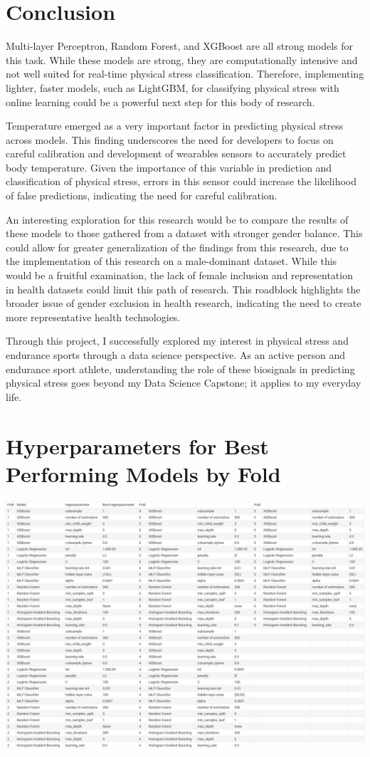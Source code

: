 \documentclass{article}
\begin{document}
\section{Conclusion}

Multi-layer Perceptron, Random Forest, and XGBoost are all strong models for this task. While these models are strong, they are computationally intensive and not well suited for real-time physical stress classification. Therefore, implementing lighter, faster models, such as LightGBM, for classifying physical stress with online learning could be a powerful next step for this body of research. 

Temperature emerged as a very important factor in predicting physical stress across models. This finding underscores the need for developers to focus on careful calibration and development of wearables sensors to accurately predict body temperature. Given the importance of this variable in prediction and classification of physical stress, errors in this sensor could increase the likelihood of false predictions, indicating the need for careful calibration.

An interesting exploration for this research would be to compare the results of these models to those gathered from a dataset with stronger gender balance. This could allow for greater generalization of the findings from this research, due to the implementation of this research on a male-dominant dataset. While this would be a fruitful examination, the lack of female inclusion and representation in health datasets could limit this path of research. This roadblock highlights the broader issue of gender exclusion in health research, indicating the need to create more representative health technologies.

Through this project, I successfully explored my interest in physical stress and endurance sports through a data science perspective. As an active person and endurance sport athlete, understanding the role of these biosignals in predicting physical stress goes beyond my Data Science Capstone; it applies to my everyday life. 

\newpage
\appendix
\section{Hyperparameters for Best Performing Models by Fold}
\includegraphics[scale = .35]{images/hyperparams.png}

\clearpage



\end{document}

